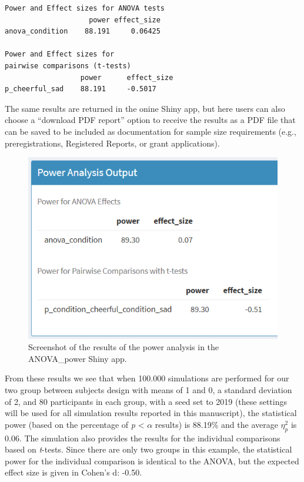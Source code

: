 \documentclass[
  ,jou,floatsintext]{apa6}
\begin{document}
\begin{verbatim}
Power and Effect sizes for ANOVA tests
                    power effect_size
anova_condition    88.191     0.06425

Power and Effect sizes for 
pairwise comparisons (t-tests)
                  power      effect_size
p_cheerful_sad    88.191     -0.5017
\end{verbatim}

The same results are returned in the onine Shiny app, but here users can also choose a \enquote{download PDF report} option to receive the results as a PDF file that can be saved to be included as documentation for sample size requirements (e.g., preregistrations, Registered Reports, or grant applications).

\begin{figure}
\centering
\includegraphics{screenshots/anova_power_result.png}
\caption{Screenshot of the results of the power analysis in the ANOVA\_power Shiny app.}
\end{figure}

From these results we see that when 100.000 simulations are performed for our two group between subjects design with means of 1 and 0, a standard deviation of 2, and 80 participants in each group, with a seed set to 2019 (these settings will be used for all simulation results reported in this manuscript), the statistical power (based on the percentage of \emph{p} \textless{} \(\alpha\) results) is 88.19\% and the average \(\eta_p^2\) is 0.06.
The simulation also provides the results for the individual comparisons based on \emph{t}-tests.
Since there are only two groups in this example, the statistical power for the individual comparison is identical to the ANOVA, but the expected effect size is given in Cohen's d: -0.50.
\end{document}
